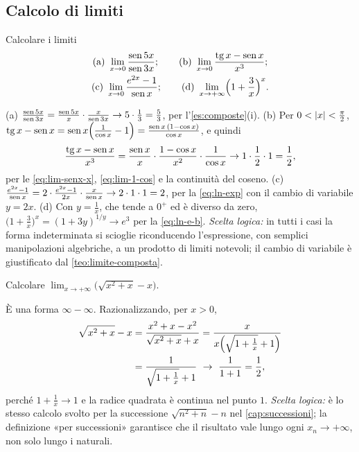 \subsection*{Calcolo di limiti}

\begin{esercizio}\label{es:calcolo-limiti-4}
Calcolare i limiti
\begin{gather*}
  \text{(a)}\ \lim_{x\to0}\frac{\operatorname{sen}5x}{\operatorname{sen}3x};\qquad
  \text{(b)}\ \lim_{x\to0}\frac{\operatorname{tg} x-\operatorname{sen} x}{x^{3}};\\
  \text{(c)}\ \lim_{x\to0}\frac{e^{2x}-1}{\operatorname{sen} x};\qquad
  \text{(d)}\ \lim_{x\to+\infty}\Bigl(1+\frac3x\Bigr)^{x}.
\end{gather*}
\begin{soluzione}
(a) $\frac{\operatorname{sen}5x}{\operatorname{sen}3x}=\frac{\operatorname{sen}5x}{x}\cdot\frac{x}{\operatorname{sen}3x}\to5\cdot\frac13=\frac53$,
per l'\cref{es:composte}(i). (b) Per $0<\lvert x\rvert<\frac\pi2$,
$\operatorname{tg} x-\operatorname{sen} x=\operatorname{sen} x\Bigl(\frac1{\cos x}-1\Bigr)=\frac{\operatorname{sen} x\,(1-\cos x)}{\cos x}$, e quindi
\[
  \frac{\operatorname{tg} x-\operatorname{sen} x}{x^{3}}=\frac{\operatorname{sen} x}{x}\cdot\frac{1-\cos x}{x^{2}}\cdot\frac1{\cos x}
  \to1\cdot\frac12\cdot1=\frac12,
\]
per le \eqref{eq:lim-senx-x}, \eqref{eq:lim-1-cos} e la continuità del coseno.
(c) $\frac{e^{2x}-1}{\operatorname{sen} x}=2\cdot\frac{e^{2x}-1}{2x}\cdot\frac{x}{\operatorname{sen} x}\to2\cdot1\cdot1=2$,
per la \eqref{eq:ln-exp} con il cambio di variabile $y=2x$. (d) Con $y=\frac1x$, che
tende a $0^{+}$ ed è diverso da zero, $\bigl(1+\frac3x\bigr)^{x}=(1+3y)^{1/y}\to e^{3}$ per
la \eqref{eq:ln-e-b}. \emph{Scelta logica:} in tutti i casi la forma indeterminata si
scioglie riconducendo l'espressione, con semplici manipolazioni algebriche, a un prodotto
di limiti notevoli; il cambio di variabile è giustificato dal \cref{teo:limite-composta}.
\end{soluzione}
\end{esercizio}

\begin{esercizio}
Calcolare $\displaystyle\lim_{x\to+\infty}\bigl(\sqrt{x^{2}+x}-x\bigr)$.
\begin{soluzione}
È una forma $\infty-\infty$. Razionalizzando, per $x>0$,
\begin{align*}
  \sqrt{x^{2}+x}-x&=\frac{x^{2}+x-x^{2}}{\sqrt{x^{2}+x}+x}=\frac{x}{x\Bigl(\sqrt{1+\frac1x}+1\Bigr)}\\
  &=\frac1{\sqrt{1+\frac1x}+1}\ \to\ \frac1{1+1}=\frac12,
\end{align*}
perché $1+\frac1x\to1$ e la radice quadrata è continua nel punto $1$.
\emph{Scelta logica:} è lo stesso calcolo svolto per la successione $\sqrt{n^{2}+n}-n$ nel
\cref{cap:successioni}; la definizione «per successioni» garantisce che il risultato vale
lungo ogni $x_{n}\to+\infty$, non solo lungo i naturali.
\end{soluzione}
\end{esercizio}

